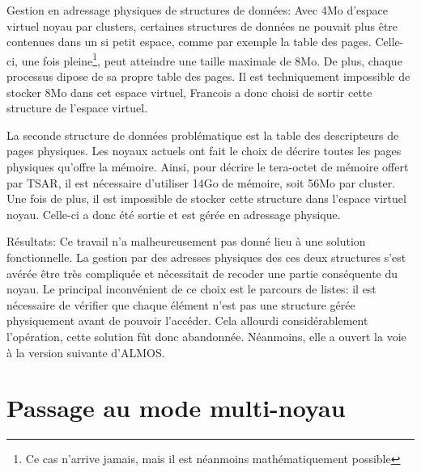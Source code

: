       \begin{paragraph}{Gestion en adressage physiques de structures de données:}
        Avec 4Mo d'espace virtuel noyau par clusters, certaines structures de
        données ne pouvait plus être contenues dans un si petit espace, comme
        par exemple la table des pages. Celle-ci, une fois pleine\footnote{Ce
          cas n'arrive jamais, mais il est néanmoins mathématiquement possible},
        peut atteindre une taille maximale de 8Mo. De plus, chaque processus
        dipose de sa propre table des pages. Il est techniquement impossible de
        stocker 8Mo dans cet espace virtuel, Francois a donc choisi de sortir
        cette structure de l'espace virtuel.

        La seconde structure de données problématique est la table des
        descripteurs de pages physiques. Les noyaux actuels ont fait le choix de
        décrire toutes les pages physiques qu'offre la mémoire. Ainsi, pour
        décrire le tera-octet de mémoire offert par TSAR, il est nécessaire
        d'utiliser 14Go de mémoire, soit 56Mo par cluster. Une fois de plus, il
        est impossible de stocker cette structure dans l'espace virtuel
        noyau. Celle-ci a donc été sortie et est gérée en adressage physique.
      \end{paragraph}

      \begin{paragraph}{Résultats:}
        Ce travail n'a malheureusement pas donné lieu à une solution
        fonctionnelle. La gestion par des adresses physiques des ces deux
        structures s'est avérée être très compliquée et nécessitait de recoder
        une partie conséquente du noyau. Le principal inconvénient de ce choix
        est le parcours de listes: il est nécessaire de vérifier que chaque
        élément n'est pas une structure gérée physiquement avant de pouvoir
        l'accéder. Cela allourdi considérablement l'opération, cette solution
        fût donc abandonnée. Néanmoins, elle a ouvert la voie à la version
        suivante d'ALMOS.
      \end{paragraph}

      
  \section{Passage au mode multi-noyau}
  \label{sec:multi-noyau}

